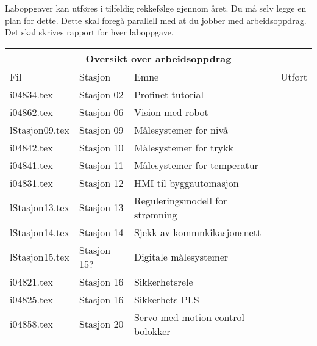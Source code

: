 Laboppgaver kan utføres i tilfeldig rekkefølge gjennom året. Du må selv legge en plan for dette. Dette skal foregå parallell med at du jobber med arbeidsoppdrag. Det skal skrives rapport for hver laboppgave.  
\begin{center}
	\begin{tabular}{| m{2cm} |m{2cm} |m{5cm} |m{1cm} |} 
\hline
	\multicolumn{4}{|c|}{\textbf{\cellcolor[HTML]{D5D5D5}Oversikt over arbeidsoppdrag}} \\
\hline
\hline
\rowcolor [HTML]{D5D5D5}
Fil	&Stasjon&Emne&Utført\\ \hline
	i04834.tex  & Stasjon 02 &  Profinet tutorial&\\ \cline{1-4}
	i04862.tex  & Stasjon 06 & Vision med robot &\\ \hline
	lStasjon09.tex  & Stasjon 09 & Målesystemer for nivå&\\ \cline{1-4}
	i04842.tex  & Stasjon 10 & Målesystemer for trykk&\\ \cline{1-4}
	i04841.tex  & Stasjon 11 & Målesystemer for temperatur& \\ \cline{1-4}
	i04831.tex  & Stasjon 12 & HMI til byggautomasjon & \\ \cline{1-4}
	lStasjon13.tex  & Stasjon 13 & Reguleringsmodell for strømning&\\ \cline{1-4}%
	lStasjon14.tex  & Stasjon 14 & Sjekk av kommnkikasjonsnett&\\ \cline{1-4}
	lStasjon15.tex  & Stasjon 15? & Digitale målesystemer &\\ \hline
	i04821.tex  & Stasjon 16 & Sikkerhetsrele& \\ \cline{1-4}
	i04825.tex  & Stasjon 16 & Sikkerhets PLS &\\ \cline{1-4}
	i04858.tex  & Stasjon 20 & Servo med motion control bolokker&\\  \cline{1-4}
\end{tabular}
\end{center}
